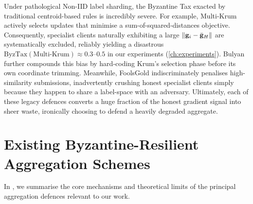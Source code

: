 \documentclass[../main]{subfiles}
\begin{document}
Under pathological Non-IID label sharding, the Byzantine Tax exacted by traditional centroid-based rules is incredibly severe. For example, Multi-Krum \citep{blanchard2017machine} actively selects updates that minimise a sum-of-squared-distances objective. Consequently, specialist clients naturally exhibiting a large $\|\mathbf{g}_{i} - \bar{\mathbf{g}}_{H}\|$ are systematically excluded, reliably yielding a disastrous $\mathrm{ByzTax}(\text{Multi-Krum}) \approx 0.3$--$0.5$ in our experiments (\cref{ch:experiments}). Bulyan \citep{mhamdi2018hidden} further compounds this bias by hard-coding Krum's selection phase before its own coordinate trimming. Meanwhile, FoolsGold \citep{fung2020limitations} indiscriminately penalises high-similarity submissions, inadvertently crushing honest specialist clients simply because they happen to share a label-space with an adversary. Ultimately, each of these legacy defences converts a huge fraction of the honest gradient signal into sheer waste, ironically choosing to defend a heavily degraded aggregate.

\section{Existing Byzantine-Resilient Aggregation Schemes}
\label{sec:bg_existing}

In , we summarise the core mechanisms and theoretical limits of the principal aggregation defences relevant to our work.
\end{document}
